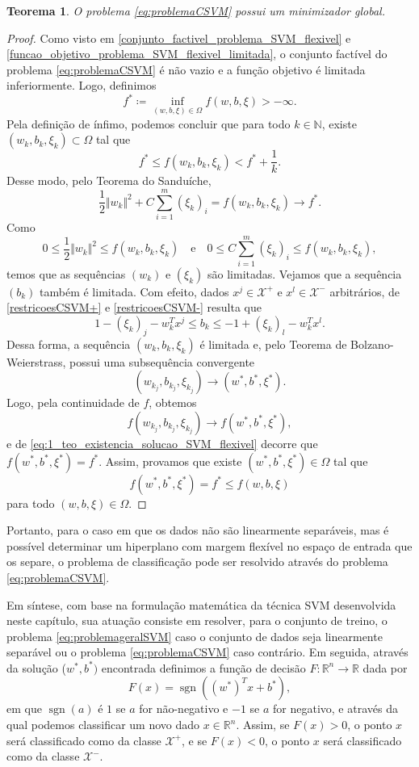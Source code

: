 \documentclass[12pt,a4paper]{scrartcl}
\DeclareMathOperator{\sgn}{sgn}
\def\Xset{\mathcal{X}}
\def\RR{\mathds{R}}
\newtheorem{teo}{Teorema}
\theoremstyle{definition}%
\begin{document}
\begin{teo} \label{teo:unicidade_solucao_problema_SVM_flexivel}
O problema \eqref{eq:problemaCSVM} possui um minimizador global.
\end{teo}
\begin{proof}
Como visto em \eqref{conjunto_factivel_problema_SVM_flexivel} e \eqref{funcao_objetivo_problema_SVM_flexivel_limitada}, o conjunto factível do problema \eqref{eq:problemaCSVM} é não vazio e a função objetivo é limitada inferiormente. Logo, definimos
\[
f^{*} \coloneqq \inf_{(w,b,\xi) \in \Omega} f(w,b,\xi) > -\infty.
\]
Pela definição de ínfimo, podemos concluir que para todo $k\in \mathds{N}$, existe $(w_{k}, b_{k}, \xi_{k}) \subset \Omega $ tal que
\[
f^{*} \leq f(w_{k}, b_{k}, \xi_{k}) < f^{*} + \dfrac{1}{k} .
\]
Desse modo, pelo Teorema do Sanduíche, 
\[ \label{eq:1_teo_existencia_solucao_SVM_flexivel}
\dfrac{1}{2} \Vert w_{k} \Vert^{2} + C\sum_{i=1}^{m} (\xi_{k})_{i} = f(w_{k}, b_{k}, \xi_{k}) \rightarrow f^{*} .
\]
Como
\[
0\leq \dfrac{1}{2} \Vert w_{k} \Vert^{2} \leq f(w_{k}, b_{k}, \xi_{k}) \quad \text{e} \quad 0 \leq C\sum_{i=1}^{m} (\xi_{k})_{i} \leq f(w_{k}, b_{k}, \xi_{k}) ,
\]
temos que as sequências $(w_{k})$ e $(\xi_{k})$ são limitadas. Vejamos que a sequência $(b_{k})$ também é limitada. Com efeito, dados $x^{j} \in \Xset^{+}$ e $x^{l} \in \Xset^{-}$ arbitrários, de \eqref{restricoesCSVM+} e \eqref{restricoesCSVM-} resulta que 
\[
1 - (\xi_{k})_{j} - w_{k}^{T} x^{j} \leq b_{k} \leq -1 + (\xi_{k})_{l} - w_{k}^{T} x^{l} .
\]
Dessa forma, a sequência $(w_{k}, b_{k}, \xi_{k})$ é limitada e, pelo Teorema de Bolzano-Weierstrass, possui uma subsequência convergente 
\[
(w_{k_{j}}, b_{k_{j}}, \xi_{k_{j}}) \rightarrow  (w^{*}, b^{*}, \xi^{*}) .
\]
Logo, pela continuidade de $f$, obtemos
\[
f(w_{k_{j}}, b_{k_{j}}, \xi_{k_{j}}) \rightarrow  f(w^{*}, b^{*}, \xi^{*}) ,
\]
e de \eqref{eq:1_teo_existencia_solucao_SVM_flexivel} decorre que $f(w^{*}, b^{*}, \xi^{*}) = f^{*}$. Assim, provamos que existe $(w^{*}, b^{*}, \xi^{*}) \in \Omega$ tal que
\[
f(w^{*}, b^{*}, \xi^{*}) = f^{*} \leq f(w, b, \xi)
\]
para todo $(w, b, \xi) \in \Omega$.
\end{proof}

Portanto, para o caso em que os dados não são linearmente separáveis, mas é possível determinar um hiperplano com margem flexível no espaço de entrada que os separe, o problema de classificação pode ser resolvido através do problema \eqref{eq:problemaCSVM}.

Em síntese, com base na formulação matemática da técnica SVM desenvolvida neste capítulo, sua atuação consiste em resolver, para o conjunto de treino, o problema \eqref{eq:problemageralSVM} caso o conjunto de dados seja linearmente separável ou o problema \eqref{eq:problemaCSVM} caso contrário. Em seguida, através da solução ($w^{*}, b^{*})$ encontrada definimos a função de decisão $F: \RR^{n} \rightarrow \RR$ dada por
\[
F(x) = \sgn ((w^{*})^{T} x + b^{*}),
\]
em que $\sgn (a)$ é $1$ se $a$ for não-negativo e $-1$ se $a$ for negativo, e através da qual podemos classificar um novo dado $x\in \RR^{n}$. Assim, se $F(x) >0$, o ponto $x$ será classificado como da classe $\Xset^{+}$, e se $F(x)<0$, o ponto $x$ será classificado como da classe $\Xset^{-}$.
\end{document}
